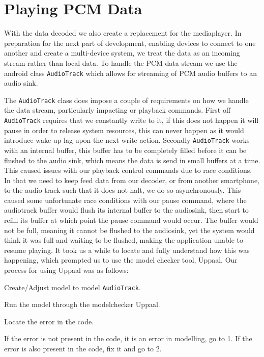 \section{Playing \ac{PCM} Data}
With the data decoded we also create a replacement for the mediaplayer.
In preparation for the next part of development, enabling devices to connect to one another and create a multi-device system, we treat the data as an incoming stream rather than local data.
To handle the \ac{PCM} data stream we use the android class \texttt{AudioTrack} which allows for streaming of PCM audio buffers to an audio sink.

The \texttt{AudioTrack} class does impose a couple of requirements on how we handle the data stream, particularly impacting or playback commands.
First off \texttt{AudioTrack} requires that we constantly write to it, if this does not happen it will pause in order to release system resources, this can never happen as it would introduce wake up lag upon the next write action.
Secondly \texttt{AudioTrack} works with an internal buffer, this buffer has to be completely filled before it can be flushed to the audio sink, which means the data is send in small buffers at a time.\cite{audiotrack}
This caused issues with our playback control commands due to race conditions.
In that we need to keep feed data from our decoder, or from another smartphone, to the audio track such that it does not halt, we do so asynchronously.
This caused some unfortunate race conditions with our pause command, where the audiotrack buffer would flush its internal buffer to the audiosink, then start to refill its buffer at which point the pause command would occur.
The buffer would not be full, meaning it cannot be flushed to the audiosink, yet the system would think it was full and waiting to be flushed, making the application unable to resume playing.
It took us a while to locate and fully understand how this was happening, which prompted us to use the model checker tool, Uppaal.
Our process for using Uppaal was as follows:
\begin{enumberate}
    \item Create/Adjust model to model \texttt{AudioTrack}.
    \item Run the model through the modelchecker Uppaal.
    \item Locate the error in the code.
    \item If the error is not present in the code, it is an error in modelling, go to 1. If the error is also present in the code, fix it and go to 2.
\end{enumberate}


